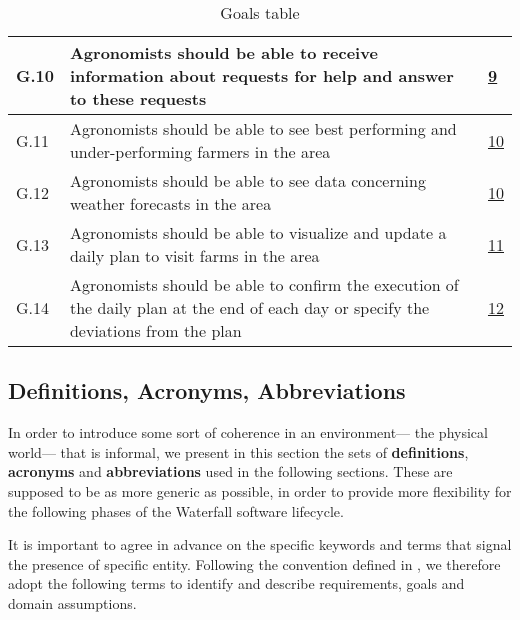 \begin{table}[H]
\begin{tabular}{|l|m{}|l|}
        \hline
        G.10                                                      &  Agronomists should be able to receive information about requests for help and answer to these requests   &    \hyperref[line:agronomistPrivileges]{9}\\%
        \hline
        G.11                                               &     Agronomists should be able to see best performing and under-performing farmers in the area &   \hyperref[line:agronomistPrivileges]{10} \\
        \hline
        G.12                                              &   Agronomists should be able to see data concerning weather forecasts in the area     &   \hyperref[line:agronomistPrivileges]{10} \\
        \hline
        G.13                                               &     Agronomists should be able to visualize and update a daily plan to visit farms in the area &   \hyperref[line:agronomistPrivileges]{11} \\
        \hline
        G.14                                              &   Agronomists should be able to confirm the execution of the daily plan at the end of each day or specify the deviations from the plan     &   \hyperref[line:agronomistPrivileges]{12} \\
        \hline
    \end{tabular}
    
    \caption{\label{tab:goals}Goals table}
\end{table}

\newpage
\subsection{Definitions, Acronyms, Abbreviations}
In order to introduce some sort of coherence in an environment--- the physical world--- that is informal, we present in this section the sets of \textbf{definitions}, \textbf{acronyms} and \textbf{abbreviations} used in the following sections. These are supposed to be as more generic as possible, in order to provide more flexibility for the following phases of the Waterfall software lifecycle.

It is important to agree in advance on the specific keywords and terms that signal the presence of specific entity. Following the convention defined in \cite{iso_ieee_standard}, we therefore adopt the following terms to identify and describe requirements, goals and domain assumptions.

